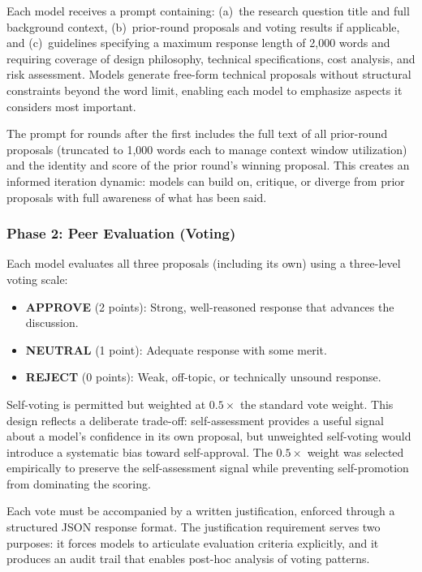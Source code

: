 \documentclass[11pt,a4paper]{article}
\begin{document}
Each model receives a prompt containing: (a)~the research question title and full background context, (b)~prior-round proposals and voting results if applicable, and (c)~guidelines specifying a maximum response length of 2{,}000 words and requiring coverage of design philosophy, technical specifications, cost analysis, and risk assessment. Models generate free-form technical proposals without structural constraints beyond the word limit, enabling each model to emphasize aspects it considers most important.

The prompt for rounds after the first includes the full text of all prior-round proposals (truncated to 1{,}000 words each to manage context window utilization) and the identity and score of the prior round's winning proposal. This creates an informed iteration dynamic: models can build on, critique, or diverge from prior proposals with full awareness of what has been said.

\subsubsection{Phase 2: Peer Evaluation (Voting)}

Each model evaluates all three proposals (including its own) using a three-level voting scale:

\begin{itemize}[nosep]
    \item \textbf{APPROVE} (2 points): Strong, well-reasoned response that advances the discussion.
    \item \textbf{NEUTRAL} (1 point): Adequate response with some merit.
    \item \textbf{REJECT} (0 points): Weak, off-topic, or technically unsound response.
\end{itemize}

Self-voting is permitted but weighted at $0.5\times$ the standard vote weight. This design reflects a deliberate trade-off: self-assessment provides a useful signal about a model's confidence in its own proposal, but unweighted self-voting would introduce a systematic bias toward self-approval. The $0.5\times$ weight was selected empirically to preserve the self-assessment signal while preventing self-promotion from dominating the scoring.

Each vote must be accompanied by a written justification, enforced through a structured JSON response format. The justification requirement serves two purposes: it forces models to articulate evaluation criteria explicitly, and it produces an audit trail that enables post-hoc analysis of voting patterns.
\end{document}
